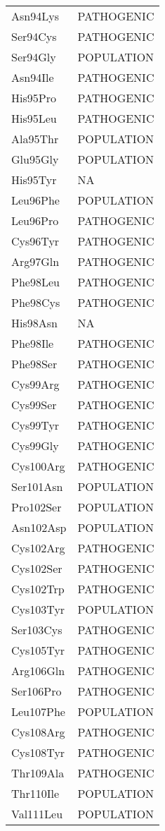 \begin{tiny}
\begin{longtable}[l]{l|l}
	Asn94Lys & PATHOGENIC \\
	Ser94Cys & PATHOGENIC \\
	Ser94Gly & POPULATION \\
	Asn94Ile & PATHOGENIC \\
	His95Pro & PATHOGENIC \\
	His95Leu & PATHOGENIC \\
	Ala95Thr & POPULATION \\
	Glu95Gly & POPULATION \\
	His95Tyr & NA \\
	Leu96Phe & POPULATION \\
	Leu96Pro & PATHOGENIC \\
	Cys96Tyr & PATHOGENIC \\
	Arg97Gln & PATHOGENIC \\
	Phe98Leu & PATHOGENIC \\
	Phe98Cys & PATHOGENIC \\
	His98Asn & NA \\
	Phe98Ile & PATHOGENIC \\
	Phe98Ser & PATHOGENIC \\
	Cys99Arg & PATHOGENIC \\
	Cys99Ser & PATHOGENIC \\
	Cys99Tyr & PATHOGENIC \\
	Cys99Gly & PATHOGENIC \\
	Cys100Arg & PATHOGENIC \\
	Ser101Asn & POPULATION \\
	Pro102Ser & POPULATION \\
	Asn102Asp & POPULATION \\
	Cys102Arg & PATHOGENIC \\
	Cys102Ser & PATHOGENIC \\
	Cys102Trp & PATHOGENIC \\
	Cys103Tyr & POPULATION \\
	Ser103Cys & PATHOGENIC \\
	Cys105Tyr & PATHOGENIC \\
	Arg106Gln & PATHOGENIC \\
	Ser106Pro & PATHOGENIC \\
	Leu107Phe & POPULATION \\
	Cys108Arg & PATHOGENIC \\
	Cys108Tyr & PATHOGENIC \\
	Thr109Ala & PATHOGENIC \\
	Thr110Ile & POPULATION \\
	Val111Leu & POPULATION \\

\end{longtable}
\end{tiny}
